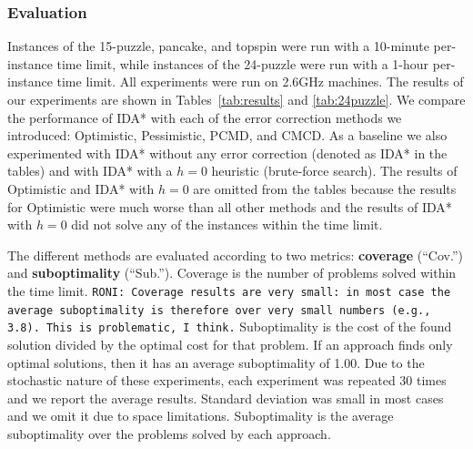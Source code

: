 \documentclass{article}
\newcommand{\roni}[1]{\mbox{\tt RONI: #1}}
\begin{document}

\subsubsection{Evaluation}

Instances of the 15-puzzle, pancake, and topspin were run with a 10-minute per-instance time limit, while instances of the 24-puzzle were run with a 1-hour per-instance time limit. All experiments were run 
%
%
on 2.6GHz machines. %
The results of our experiments are shown in Tables~\ref{tab:results} and \ref{tab:24puzzle}. 
%
We compare the performance of IDA* with each of the error correction methods we introduced: Optimistic, Pessimistic, PCMD, and CMCD. As a baseline we also experimented with IDA* without any error correction (denoted as IDA* in the tables) and with IDA* with a $h=0$ heuristic (brute-force search). The results of Optimistic and IDA* with $h=0$ are omitted from the tables because the results for Optimistic were much worse than all other methods and the results of IDA* with $h=0$ did not solve any of the instances within the time limit. 

The different methods are evaluated according to two metrics: \textbf{coverage} (``Cov.'') and \textbf{suboptimality} (``Sub.''). Coverage is the number of problems solved within the time limit. \roni{Coverage results are very small: in most case the average suboptimality is therefore over very small numbers (e.g., 3.8). This is problematic, I think.}
Suboptimality is the cost of the found solution divided by the optimal cost for that problem. %
If an approach finds only optimal solutions, then it has an average suboptimality of 1.00.  
%
%
%
Due to the stochastic nature of these experiments, each experiment was repeated 30 times and we report the average results. Standard deviation was small in most cases and we omit it due to space limitations. Suboptimality is the average suboptimality over the problems solved by each approach.
\end{document}
